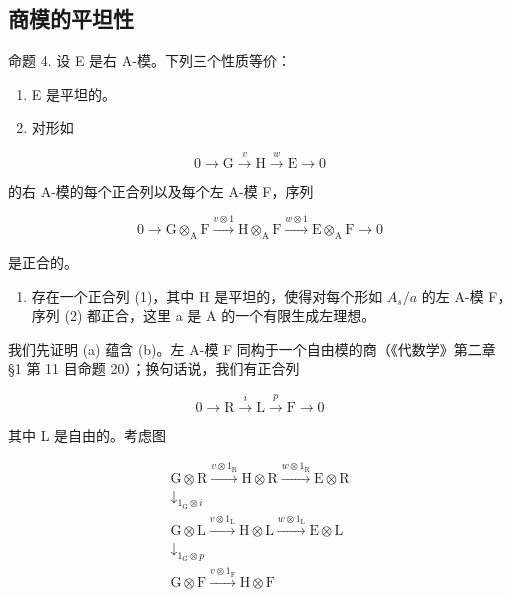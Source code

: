 \subsection{商模的平坦性}

命题 4. 设 E 是右 A-模。下列三个性质等价：

\begin{enumerate}
\def\labelenumi{(\alph{enumi})}
\item
  E 是平坦的。
\item
  对形如
\end{enumerate}

\[
0 \longrightarrow \mathrm{G} \stackrel {v} {\longrightarrow} \mathrm{H} \stackrel {w} {\longrightarrow} \mathrm{E} \longrightarrow 0\tag{1}
\]

的右 A-模的每个正合列以及每个左 A-模 F，序列

\[
0 \longrightarrow \mathrm{G} \otimes_ {\mathrm{A}} \mathrm{F} \xrightarrow {v \otimes 1} \mathrm{H} \otimes_ {\mathrm{A}} \mathrm{F} \xrightarrow {w \otimes 1} \mathrm{E} \otimes_ {\mathrm{A}} \mathrm{F} \longrightarrow 0\tag{2}
\]

是正合的。

\begin{enumerate}
\def\labelenumi{(\alph{enumi})}
\setcounter{enumi}{2}
\tightlist
\item
  存在一个正合列 (1)，其中 H 是平坦的，使得对每个形如 \(A_{s}/a\) 的左 A-模 F，序列 (2) 都正合，这里 a 是 A 的一个有限生成左理想。
\end{enumerate}

我们先证明 (a) 蕴含 (b)。左 A-模 F 同构于一个自由模的商（《代数学》第二章 §1 第 11 目命题 20）；换句话说，我们有正合列

\[
0 \longrightarrow \mathrm{R} \stackrel {i} {\longrightarrow} \mathrm{L} \stackrel {p} {\longrightarrow} \mathrm{F} \longrightarrow 0
\]

其中 L 是自由的。考虑图

\[
\begin{array}{c} \mathrm{G} \otimes \mathrm{R} \xrightarrow {v \otimes 1 _ {\mathrm{R}}} \mathrm{H} \otimes \mathrm{R} \xrightarrow {w \otimes 1 _ {\mathrm{R}}} \mathrm{E} \otimes \mathrm{R} \\ \downarrow_ {1 _ {\mathrm{G}} \otimes i} \\ \mathrm{G} \otimes \mathrm{L} \xrightarrow {v \otimes 1 _ {\mathrm{L}}} \mathrm{H} \otimes \mathrm{L} \xrightarrow {w \otimes 1 _ {\mathrm{L}}} \mathrm{E} \otimes \mathrm{L} \\ \downarrow_ {1 _ {\mathrm{G}} \otimes p} \\ \mathrm{G} \otimes \mathrm{F} \xrightarrow {v \otimes 1 _ {\mathrm{F}}} \mathrm{H} \otimes \mathrm{F} \end{array}\tag{3}
\]

